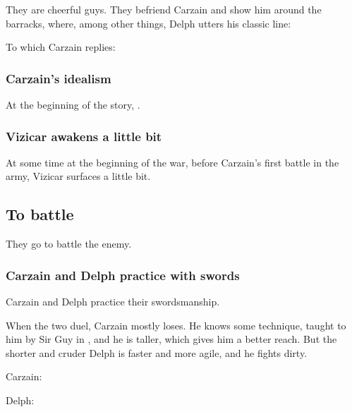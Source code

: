 They are cheerful guys. 
They befriend Carzain and show him around the barracks, where, among other things, Delph utters his classic line: 

To which Carzain replies: 






\subsubsection{Carzain's idealism}
At the beginning of the story, .





\subsubsection{Vizicar awakens a little bit}
At some time at the beginning of the war, before Carzain's first battle in the army, Vizicar surfaces a little bit. 









\subsection{To battle}
They go to battle the enemy. 





\subsubsection{Carzain and Delph practice with swords}
Carzain and Delph practice their swordsmanship. 

When the two duel, Carzain mostly loses. He knows some technique, taught to him by Sir Guy in \Redglen, and he is taller, which gives him a better reach. But the shorter and cruder Delph is faster and more agile, and he fights dirty. 

Carzain: 

Delph: 





